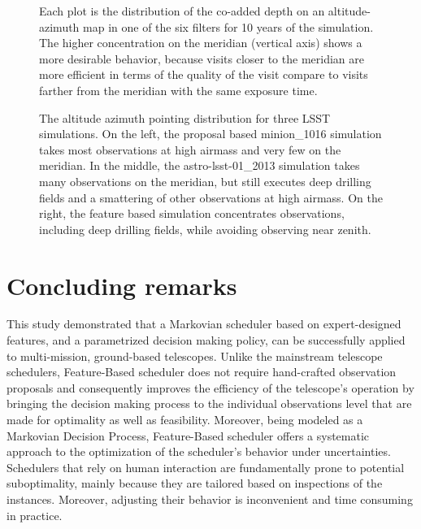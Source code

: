 \documentclass[12pt]{aastex62}
\theoremstyle{definition}
\begin{document}
\begin{figure}[h!]
\caption{Each plot is the distribution of the co-added depth on an altitude-azimuth map in one of the six filters for 10 years of the simulation. The higher concentration on the meridian (vertical axis) shows a more desirable behavior, because visits closer to the meridian are more efficient in terms of the quality of the visit compare to visits farther from the meridian with the same exposure time.}
\label{fig_10yrs_AltAz}
\end{figure}


\begin{figure}
\caption{The altitude azimuth pointing distribution for three LSST simulations. On the left, the proposal based minion\_1016 simulation takes most observations at high airmass and very few on the meridian. In the middle, the astro-lsst-01\_2013 simulation takes many observations on the meridian, but still executes deep drilling fields and a smattering of other observations at high airmass. On the right, the feature based simulation concentrates observations, including deep drilling fields, while avoiding observing near zenith. }\label{fig_all_alt_az}
\end{figure}

\section{Concluding remarks}\label{sec_conclusion}

This study demonstrated that a Markovian scheduler based on expert-designed features, and a parametrized decision making policy, can be successfully applied to multi-mission, ground-based telescopes. Unlike the mainstream telescope schedulers, Feature-Based scheduler does not require hand-crafted observation proposals and consequently improves the efficiency of the telescope's operation by bringing the decision making process to the individual observations level that are made for optimality as well as feasibility. Moreover, being modeled as a Markovian Decision Process, Feature-Based scheduler offers a systematic approach to the optimization of the scheduler's behavior under uncertainties. Schedulers that rely on human interaction are fundamentally prone to potential suboptimality, mainly because they are tailored based on inspections of the instances. Moreover, adjusting their behavior is inconvenient and time consuming in practice. 
\end{document}
